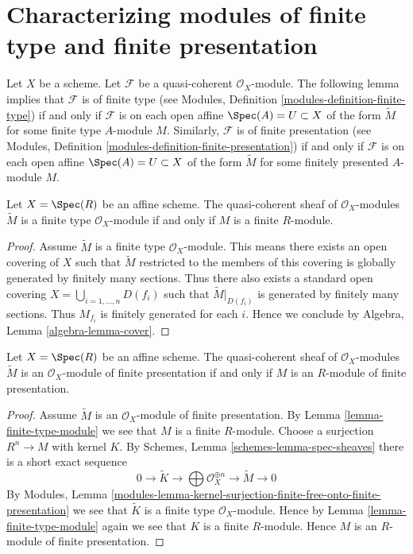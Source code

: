 \section{Characterizing modules of finite type and finite presentation}
\label{section-characterizing-finite-type-presentation}

\noindent
Let $X$ be a scheme.
Let $\mathcal{F}$ be a quasi-coherent $\mathcal{O}_X$-module.
The following lemma implies that $\mathcal{F}$ is of finite type
(see Modules, Definition \ref{modules-definition-finite-type})
if and only if $\mathcal{F}$ is
on each open affine $\Spec(A) = U \subset X$
of the form $\widetilde M$ for some finite type $A$-module $M$.
Similarly, $\mathcal{F}$ is of finite presentation
(see Modules, Definition \ref{modules-definition-finite-presentation})
if and only if $\mathcal{F}$ is
on each open affine $\Spec(A) = U \subset X$
of the form $\widetilde M$ for some finitely presented $A$-module $M$.

\begin{lemma}
\label{lemma-finite-type-module}
Let $X = \Spec(R)$ be an affine scheme.
The quasi-coherent sheaf of $\mathcal{O}_X$-modules
$\widetilde M$ is a finite type $\mathcal{O}_X$-module
if and only if $M$ is a finite $R$-module.
\end{lemma}

\begin{proof}
Assume $\widetilde M$ is a finite type $\mathcal{O}_X$-module.
This means there exists an open covering of $X$ such that
$\widetilde M$ restricted to the members of this covering is
globally generated by finitely many sections.
Thus there also exists a standard open covering
$X = \bigcup_{i = 1, \ldots, n} D(f_i)$ such that $\widetilde M|_{D(f_i)}$
is generated by finitely many sections. Thus $M_{f_i}$ is finitely
generated for each $i$. Hence we conclude by
Algebra, Lemma \ref{algebra-lemma-cover}.
\end{proof}

\begin{lemma}
\label{lemma-finite-presentation-module}
Let $X = \Spec(R)$ be an affine scheme. The quasi-coherent sheaf
of $\mathcal{O}_X$-modules $\widetilde M$ is an $\mathcal{O}_X$-module of
finite presentation if and only if $M$ is an $R$-module of finite presentation.
\end{lemma}

\begin{proof}
Assume $\widetilde M$ is an $\mathcal{O}_X$-module of finite presentation.
By Lemma \ref{lemma-finite-type-module} we see that $M$ is a finite $R$-module.
Choose a surjection $R^n \to M$ with kernel $K$. By
Schemes, Lemma \ref{schemes-lemma-spec-sheaves}
there is a short exact sequence
$$
0 \to \widetilde{K} \to
\bigoplus \mathcal{O}_X^{\oplus n} \to
\widetilde{M} \to 0
$$
By
Modules, Lemma
\ref{modules-lemma-kernel-surjection-finite-free-onto-finite-presentation}
we see that $\widetilde{K}$ is a finite type $\mathcal{O}_X$-module.
Hence by Lemma \ref{lemma-finite-type-module}
again we see that $K$ is a finite $R$-module.
Hence $M$ is an $R$-module of finite presentation.
\end{proof}



